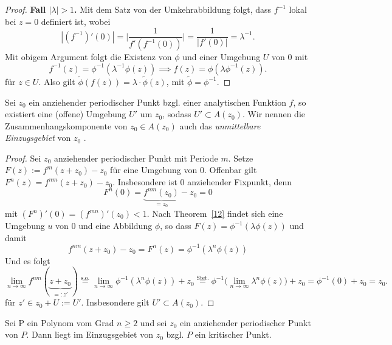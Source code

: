 \documentclass{mywork}
\newcommand{\D}{\mathbb{D}}
\begin{document}
\begin{proof}
\textbf{Fall $|\lambda|>1$.} Mit dem Satz von der Umkehrabbildung folgt, dass $f^{-1}$ lokal bei $z=0$ definiert ist, wobei
\[
|(f^{-1})'(0)|=\Bigg| \frac{1}{f'(f^{-1}(0))}\Bigg|= \frac{1}{|f'(0)|}=\lambda^{-1}.
\]
Mit obigem Argument folgt die Existenz von $\phi$ und einer Umgebung $U$ von 0 mit
\[
f^{-1}(z)=\phi^{-1}(\lambda^{-1}\phi(z)) \implies f(z)=\phi(\lambda \phi^{-1}(z)).
\]
für $z\in U$. Also gilt $\tilde \phi (f(z))=\lambda\cdot \tilde \phi(z)$, mit $\tilde \phi=\phi^{-1}$.
\end{proof}

\begin{prop} \label{13}
Sei $z_0$ ein anziehender periodischer Punkt bzgl. einer analytischen Funktion $f$, so existiert eine (offene) Umgebung $U'$ um $z_0$, sodass $U'\subset A(z_0)$. Wir nennen die Zusammenhangskomponente von $z_0\in A(z_0)$ auch das \emph{unmittelbare Einzugsgebiet} von $z_0$ .
\end{prop}

\begin{proof} 
Sei $z_0$ anziehender periodischer Punkt mit Periode $m$. 
Setze $F(z):=f^m(z+z_0)-z_0$ für eine Umgebung von $0$. Offenbar gilt $F^n(z)=f^{nm}(z+z_0)-z_0$. Insbesondere ist $0$ anziehender Fixpunkt, denn 
\[
F^{n}(0)=\underbrace{f^{nm}(z_0)}_{=z_0}-z_0=0
\] 
mit $(F^{n})'(0)=(f^{mn})'(z_0)<1$. Nach Theorem~\ref{12} findet sich eine Umgebung $u$ von $0$ und eine Abbildung $\phi$, so dass $F(z)=\phi^{-1}(\lambda\phi(z))$ und damit
\[
	f^{nm}(z+z_0)-z_0=F^n(z)=\phi^{-1}(\lambda^n \phi(z))
\]
Und es folgt
\[
\lim_{n\to \infty} f^{nm}(\underbrace{z+z_0}_{=:z'})\stackrel{\text{s.o.}}= \lim_{n\to \infty} \phi^{-1}(\lambda^n \phi(z))+z_0\stackrel{\text{Stet.}}= \phi^{-1}\Big(\lim_{n\to \infty} \lambda^n \phi(z)\Big)+z_0=\phi^{-1}(0)+z_0=z_0.
\]
für $z'\in z_0+U:=U'$. Insbesondere gilt $U'\subset A(z_0)$.
\end{proof}

\begin{thm} \label{last}
Sei P ein Polynom vom Grad $n\ge 2$ und sei $z_0$ ein anziehender periodischer Punkt von $P$. Dann liegt im Einzugsgebiet von $z_0$ bzgl. $P$ ein kritischer Punkt.
\end{thm}
\end{document}
